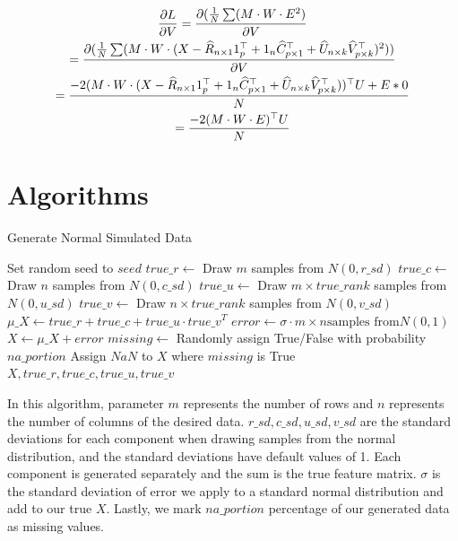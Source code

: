 \documentclass{article}
\begin{document}
\begin{gather*}
    \pdv{L}{V} = \pdv{(\frac{1}{N}\sum(M \cdot W \cdot E^2)}{V} \\
    = \pdv{(\frac{1}{N}\sum(M \cdot W \cdot (X - \widehat{R}_{n \times 1}1^{\top}_{p} + 1_{n}\widehat{C}_{p \times 1}^{\top} + \widehat{U}_{n \times k}\widehat{V}^{\top}_{p \times k})^2))}{V}\\
    = \frac{-2(M \cdot W \cdot (X - \widehat{R}_{n \times 1}1^{\top}_{p} + 1_{n}\widehat{C}_{p \times 1}^{\top} + \widehat{U}_{n \times k}\widehat{V}^{\top}_{p \times k}))^\top U + E*0}{N}\\
    = \frac{-2(M \cdot W \cdot E)^\top U}{N}
\end{gather*}


\section{Algorithms} \label{appendix.b}
\begin{algorithm}[H]
\caption{Generate Normal Simulated Data}
\begin{algorithmic}[1]
    \State Set random seed to $seed$
    \State $true\_r \gets$ Draw $m$ samples from $N(0, r\_sd)$
    \State $true\_c \gets$ Draw $n$ samples from $N(0, c\_sd)$
    \State $true\_u \gets$ Draw $m \times true\_rank$ samples from $N(0, u\_sd)$
    \State $true\_v \gets$ Draw $n \times true\_rank$ samples from $N(0, v\_sd)$
    \State $\mu\_X \gets true\_r + true\_c + true\_u \cdot true\_v^T$
    \State $error \gets \sigma \cdot m \times n \text{samples from} N(0, 1)$
    \State $X \gets \mu\_X + error$
    \State $missing \gets$ Randomly assign True/False with probability $na\_portion$
    \State Assign $NaN$ to $X$ where $missing$ is True
    \State \Return $X, true\_r, true\_c, true\_u, true\_v$
\EndProcedure
\end{algorithmic}
\end{algorithm}
In this algorithm, parameter $m$ represents the number of rows and $n$ represents the number of columns of the desired data. $r\_sd, c\_sd, u\_sd, v\_sd$ are the standard deviations for each component when drawing samples from the normal distribution, and the standard deviations have default values of 1. Each component is generated separately and the sum is the true feature matrix. $\sigma$ is the standard deviation of error we apply to a standard normal distribution and add to our true $X$. Lastly, we mark $na\_portion$ percentage of our generated data as missing values.
\end{document}
